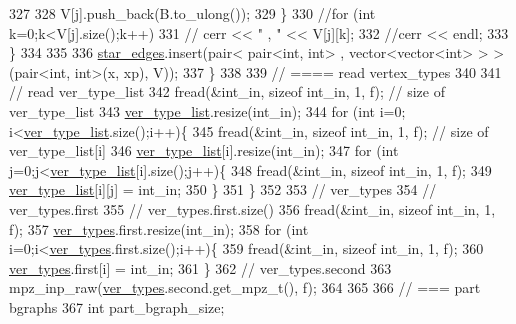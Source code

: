 \begin{DoxyCode}
327 
328         V[j].push\_back(B.to\_ulong());
329       \}
330       \textcolor{comment}{//for (int k=0;k<V[j].size();k++)}
331       \textcolor{comment}{//  cerr << " , " << V[j][k];}
332       \textcolor{comment}{//cerr << endl;}
333     \}
334 
335 
336     \hyperlink{classmarked__graph__compressed_a7df5779d313486644132bd816937f532}{star\_edges}.insert(pair< pair<int, int> , vector<vector<int> > > (pair<int, int>(x, xp), V));
337   \}
338 
339   \textcolor{comment}{// ==== read vertex\_types}
340 
341   \textcolor{comment}{// read ver\_type\_list}
342   fread(&int\_in, \textcolor{keyword}{sizeof} int\_in, 1, f); \textcolor{comment}{// size of ver\_type\_list}
343   \hyperlink{classmarked__graph__compressed_af2e3e55223d436628a02758dfae88493}{ver\_type\_list}.resize(int\_in);
344   \textcolor{keywordflow}{for} (\textcolor{keywordtype}{int} i=0; i<\hyperlink{classmarked__graph__compressed_af2e3e55223d436628a02758dfae88493}{ver\_type\_list}.size();i++)\{
345     fread(&int\_in, \textcolor{keyword}{sizeof} int\_in, 1, f); \textcolor{comment}{// size of ver\_type\_list[i]}
346     \hyperlink{classmarked__graph__compressed_af2e3e55223d436628a02758dfae88493}{ver\_type\_list}[i].resize(int\_in);
347     \textcolor{keywordflow}{for} (\textcolor{keywordtype}{int} j=0;j<\hyperlink{classmarked__graph__compressed_af2e3e55223d436628a02758dfae88493}{ver\_type\_list}[i].size();j++)\{
348       fread(&int\_in, \textcolor{keyword}{sizeof} int\_in, 1, f);
349       \hyperlink{classmarked__graph__compressed_af2e3e55223d436628a02758dfae88493}{ver\_type\_list}[i][j] = int\_in;
350     \}
351   \}
352 
353   \textcolor{comment}{// ver\_types}
354   \textcolor{comment}{// ver\_types.first}
355   \textcolor{comment}{// ver\_types.first.size()}
356   fread(&int\_in, \textcolor{keyword}{sizeof} int\_in, 1, f);
357   \hyperlink{classmarked__graph__compressed_af446cc5e23c241a92b76642fd5ebc403}{ver\_types}.first.resize(int\_in);
358   \textcolor{keywordflow}{for} (\textcolor{keywordtype}{int} i=0;i<\hyperlink{classmarked__graph__compressed_af446cc5e23c241a92b76642fd5ebc403}{ver\_types}.first.size();i++)\{
359     fread(&int\_in, \textcolor{keyword}{sizeof} int\_in, 1, f);
360     \hyperlink{classmarked__graph__compressed_af446cc5e23c241a92b76642fd5ebc403}{ver\_types}.first[i] = int\_in;
361   \}
362   \textcolor{comment}{// ver\_types.second}
363   mpz\_inp\_raw(\hyperlink{classmarked__graph__compressed_af446cc5e23c241a92b76642fd5ebc403}{ver\_types}.second.get\_mpz\_t(), f);
364 
365 
366   \textcolor{comment}{// === part bgraphs}
367   \textcolor{keywordtype}{int} part\_bgraph\_size;

\end{DoxyCode}
